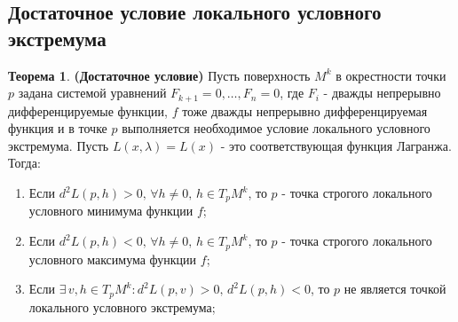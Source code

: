 \documentclass[12pt]{article}
\theoremstyle{definition}
\newtheorem{theorem}{Теорема}
\begin{document}
\newpage
\subsection*{Достаточное условие локального условного экстремума}
\begin{theorem}\textbf{(Достаточное условие)}
	Пусть поверхность $M^k$ в окрестности точки $p$ задана системой уравнений $F_{k+1} = 0, \dotsc, F_n = 0$, где $F_i$ - дважды непрерывно дифференцируемые функции, $f$ тоже дважды непрерывно дифференцируемая функция и в точке $p$ выполняется необходимое условие локального условного экстремума. Пусть $L(x,\lambda) = L(x)$ - это соответствующая функция Лагранжа. Тогда:
	\begin{enumerate}[label ={\arabic*)}]
		\item Если $d^2 L(p, h) > 0, \, \forall h \neq 0, \, h \in T_p M^k$, то $p$ - точка строгого локального условного минимума функции $f$;
		\item Если $d^2 L(p, h) < 0, \, \forall h \neq 0, \, h \in T_p M^k$, то $p$ - точка строгого локального условного максимума функции $f$;
		\item Если $\exists \, v,h \in T_p M^k \colon d^2 L(p,v) > 0, \, d^2 L(p,h) < 0$, то $p$ не является точкой локального условного экстремума;
	\end{enumerate}
\end{theorem}
\end{document}
